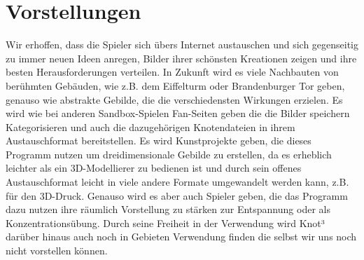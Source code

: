 \section{Vorstellungen}
Wir erhoffen, dass die Spieler sich übers Internet austauschen und sich gegenseitig zu immer neuen Ideen anregen, Bilder ihrer schönsten Kreationen zeigen und ihre besten Herausforderungen verteilen. In Zukunft wird es viele Nachbauten von berühmten Gebäuden, wie z.B. dem Eiffelturm oder Brandenburger Tor geben, genauso wie abstrakte Gebilde, die die verschiedensten Wirkungen erzielen. Es wird wie bei anderen Sandbox-Spielen Fan-Seiten geben die die Bilder speichern Kategorisieren und auch die dazugehörigen Knotendateien in ihrem Austauschformat bereitstellen. Es wird Kunstprojekte geben, die dieses Programm nutzen um dreidimensionale Gebilde zu erstellen, da es erheblich leichter als ein 3D-Modellierer zu bedienen ist und durch sein offenes Austauschformat leicht in viele andere Formate umgewandelt werden kann, z.B. für den 3D-Druck. Genauso wird es aber auch Spieler geben, die das Programm dazu nutzen ihre räumlich Vorstellung zu stärken zur Entspannung oder als Konzentrationsübung.
Durch seine Freiheit in der Verwendung wird Knot³ darüber hinaus auch noch in Gebieten Verwendung finden die selbst wir uns noch nicht vorstellen können.
